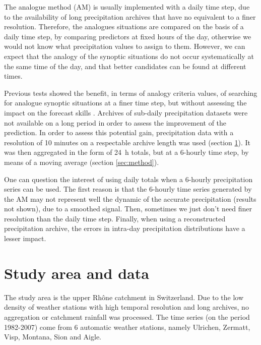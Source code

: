 \documentclass[hess]{copernicus}
\begin{document}
The analogue method (AM) is usually implemented with a daily time step, due to the availability of long precipitation archives that have no equivalent to a finer resolution. Therefore, the analogues situations are compared on the basis of a daily time step, by comparing predictors at fixed hours of the day, otherwise we would not know what precipitation values to assign to them. However, we can expect that the analogy of the synoptic situations do not occur systematically at the same time of the day, and that better candidates can be found at different times.

Previous tests showed the benefit, in terms of analogy criteria values, of searching for analogue synoptic situations at a finer time step, but without assessing the impact on the forecast skills \citep{Finet2008}. Archives of sub-daily precipitation datasets were not available on a long period in order to assess the improvement of the prediction. In order to assess this potential gain, precipitation data with a resolution of 10 minutes on a respectable archive length was used (section \ref{sec:data}). It was then aggregated in the form of 24~h totals, but at a 6-hourly time step, by means of a moving average (section \ref{sec:method}).

One can question the interest of using daily totals when a 6-hourly precipitation series can be used. The first reason is that the 6-hourly time series generated by the AM may not represent well the dynamic of the accurate precipitation (results not shown), due to a smoothed signal. Then, sometimes we just don't need finer resolution than the daily time step. Finally, when using a reconstructed precipitation archive, the errors in intra-day precipitation distributions have a lesser impact.








\section{Study area and data}
\label{sec:data}

The study area is the upper Rh\^{o}ne catchment in Switzerland. Due to the low density of weather stations with high temporal resolution and long archives, no aggregation or catchment rainfall was processed. The time series (on the period 1982-2007) come from 6 automatic weather stations, namely Ulrichen, Zermatt, Visp, Montana, Sion and Aigle.
\end{document}
